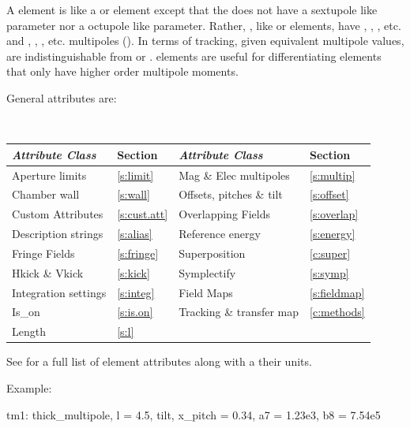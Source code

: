 {A  element is like a  or  element except that the
 does not have a  sextupole like parameter nor a  octupole like
parameter. Rather, , like  or  elements, have
, , , etc.  and , , , etc. multipoles
(). In terms of tracking, given equivalent multipole values, 
are indistinguishable from  or .   elements are
useful for differentiating elements that only have higher order multipole moments.

General  attributes are:
\begin{center}
\tt
\begin{tabular}{llll} \toprule
  {\sl Attribute Class}      & Section             & {\sl Attribute Class}      & Section            \\ \midrule
  Aperture limits            & \ref{s:limit}       & Mag \& Elec multipoles     & \ref{s:multip}     \\
  Chamber wall               & \ref{s:wall}        & Offsets, pitches \& tilt   & \ref{s:offset}     \\
  Custom Attributes          & \ref{s:cust.att}    & Overlapping Fields         & \ref{s:overlap}    \\
  Description strings        & \ref{s:alias}       & Reference energy           & \ref{s:energy}     \\ 
  Fringe Fields              & \ref{s:fringe}      & Superposition              & \ref{c:super}      \\
  Hkick \& Vkick             & \ref{s:kick}        & Symplectify                & \ref{s:symp}       \\
  Integration settings       & \ref{s:integ}       & Field Maps                 & \ref{s:fieldmap}   \\
  Is_on                      & \ref{s:is.on}       & Tracking \& transfer map   & \ref{c:methods}    \\ 
  Length                     & \ref{s:l}           &                            &                    \\
  \bottomrule
\end{tabular}
\end{center}
\toffset
See  for a full list of element attributes along with a their units.

Example:
\begin{example}
  tm1: thick_multipole, l = 4.5, tilt, x_pitch = 0.34, a7 = 1.23e3, b8 = 7.54e5
\end{example}

}
